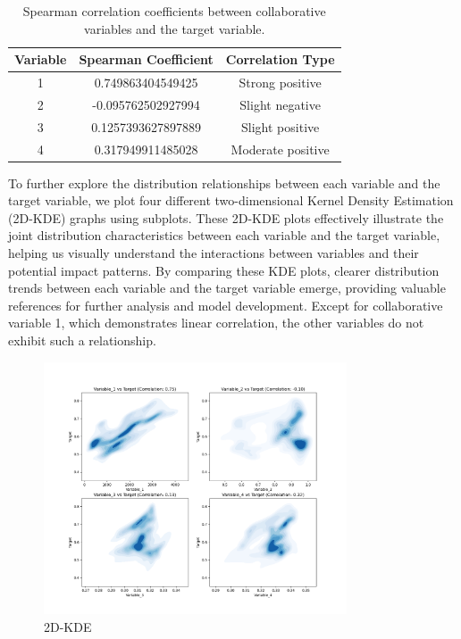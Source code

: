 \documentclass{swmcmthesis}
\begin{document}
\begin{table}[h!]
\caption{Spearman correlation coefficients between collaborative variables and the target variable.} %
\centering
\begin{tabular}{|c|c|c|}
\hline
Variable & Spearman Coefficient & Correlation Type \\ \hline
1 & 0.749863404549425 & Strong positive \\ \hline
2 & -0.095762502927994 & Slight negative \\ \hline
3 & 0.1257393627897889 & Slight positive \\ \hline
4 & 0.317949911485028 & Moderate positive \\ \hline
\end{tabular}
\label{tab:spearman_coefficients}
\end{table}

To further explore the distribution relationships between each variable and the target variable, we plot four different two-dimensional Kernel Density Estimation (2D-KDE) graphs using subplots. These 2D-KDE plots effectively illustrate the joint distribution characteristics between each variable and the target variable, helping us visually understand the interactions between variables and their potential impact patterns. By comparing these KDE plots, clearer distribution trends between each variable and the target variable emerge, providing valuable references for further analysis and model development. Except for collaborative variable 1, which demonstrates linear correlation, the other variables do not exhibit such a relationship.

\begin{figure}[h!t]
	\centering
	\includegraphics[width=0.8\textwidth]{Problem 2/Problem 2/2D Kernel Density Estimation Plot.png}
	\caption{2D-KDE}
\end{figure}
\end{document}
